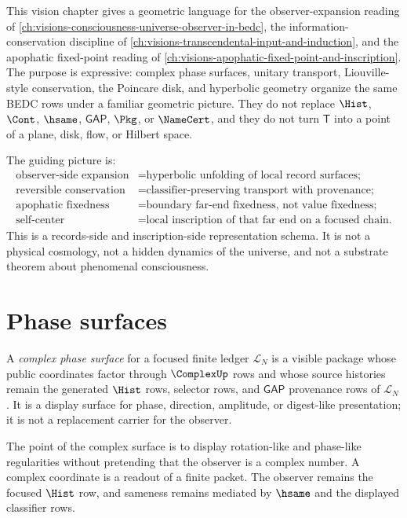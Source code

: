 This vision chapter gives a geometric language for the observer-expansion reading of \autoref{ch:visions-consciousness-universe-observer-in-bedc}, the information-conservation discipline of \autoref{ch:visions-transcendental-input-and-induction}, and the apophatic fixed-point reading of \autoref{ch:visions-apophatic-fixed-point-and-inscription}. The purpose is expressive: complex phase surfaces, unitary transport, Liouville-style conservation, the Poincare disk, and hyperbolic geometry organize the same BEDC rows under a familiar geometric picture. They do not replace $\Hist$, $\Cont$, $\hsame$, $\mathsf{GAP}$, $\Pkg$, or $\NameCert$, and they do not turn $\mathsf{T}$ into a point of a plane, disk, flow, or Hilbert space.

The guiding picture is:
$$
\begin{aligned}
\text{observer-side expansion} &= \text{hyperbolic unfolding of local record surfaces;} \\
\text{reversible conservation} &= \text{classifier-preserving transport with provenance;} \\
\text{apophatic fixedness} &= \text{boundary far-end fixedness, not value fixedness;} \\
\text{self-center} &= \text{local inscription of that far end on a focused chain.}
\end{aligned}
$$
This is a records-side and inscription-side representation schema. It is not a physical cosmology, not a hidden dynamics of the universe, and not a substrate theorem about phenomenal consciousness.

\section{Phase surfaces}
\label{sec:hyperbolic-phase-surfaces}

\begin{definition}
\label{def:hyperbolic-complex-phase-surface}
A \emph{complex phase surface} for a focused finite ledger $\mathcal{L}_N$ is a visible package whose public coordinates factor through $\ComplexUp$ rows and whose source histories remain the generated $\Hist$ rows, selector rows, and $\mathsf{GAP}$ provenance rows of $\mathcal{L}_N$. It is a display surface for phase, direction, amplitude, or digest-like presentation; it is not a replacement carrier for the observer.
\end{definition}

The point of the complex surface is to display rotation-like and phase-like regularities without pretending that the observer is a complex number. A complex coordinate is a readout of a finite packet. The observer remains the focused $\Hist$ row, and sameness remains mediated by $\hsame$ and the displayed classifier rows.

